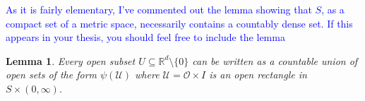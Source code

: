 \documentclass[11pt]{article}
\theoremstyle{theorem}
\newtheorem{lemma}[theorem]{Lemma}
\begin{document}
\noindent \textcolor{blue}{As it is fairly elementary, I've commented out the lemma showing that $S$, as a compact set of a metric space, necessarily contains a countably dense set. If this appears in your thesis, you should feel free to include the lemma}


\begin{lemma}\label{lem:OpenRectangle}
Every open subset $U\subseteq \mathbb{R}^d\setminus\{0\}$ can be written as a countable union of open sets of the form $\psi(\mathcal{U})$ where $\mathcal{U}=\mathcal{O}\times I$ is an open rectangle in $S\times (0,\infty)$.
\end{lemma}
\end{document}
